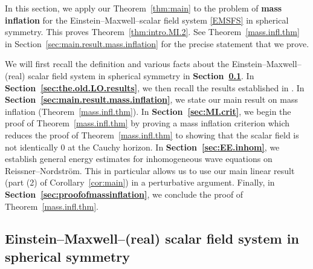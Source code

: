 \documentclass[10pt, reqno]{amsart}
\theoremstyle{definition}
\theoremstyle{remark}
\numberwithin{equation}{section}
\newcommand{\0}{\emptyset}
\begin{document}
In this section, we apply our Theorem~\ref{thm:main} to the problem of \textbf{mass inflation} for the Einstein--Maxwell--scalar field system \eqref{EMSFS} in spherical symmetry. This proves Theorem~\ref{thm:intro.MI.2}. See Theorem~\ref{mass.infl.thm} in Section~\ref{sec:main.result.mass.inflation} for the precise statement that we prove.

We will first recall the definition and various facts about the Einstein--Maxwell--(real) scalar field system in spherical symmetry in \textbf{Section~\ref{sec.SS}}. In \textbf{Section~\ref{sec:the.old.LO.results}}, we then recall the results established in \cite{LO.interior, LO.exterior}. In \textbf{Section~\ref{sec:main.result.mass.inflation}}, we state our main result on mass inflation (Theorem~\ref{mass.infl.thm}). In \textbf{Section~\ref{sec:MI.crit}}, we begin the proof of Theorem~\ref{mass.infl.thm} by proving a mass inflation criterion which reduces the proof of Theorem~\ref{mass.infl.thm} to showing that the scalar field is not identically $0$ at the Cauchy horizon. In \textbf{Section~\ref{sec:EE.inhom}}, we establish general energy estimates for inhomogeneous wave equations on Reissner--Nordstr\"om. This in particular allows us to use our main linear result (part (2) of Corollary~\ref{cor:main}) in a perturbative argument. Finally, in \textbf{Section~\ref{sec:proofofmassinflation}}, we conclude the proof of Theorem~\ref{mass.infl.thm}. 

\subsection{Einstein--Maxwell--(real) scalar field system in spherical symmetry}\label{sec.SS}
\end{document}
